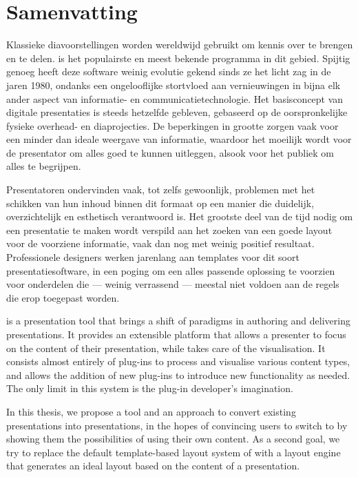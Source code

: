 
 \chapter*{Samenvatting}

  Klassieke diavoorstellingen worden wereldwijd gebruikt om kennis over te
  brengen en te delen. \ppt* is het populairste en meest bekende programma in
  dit gebied. Spijtig genoeg heeft deze software weinig evolutie gekend sinds
  ze het licht zag in de jaren 1980, ondanks een ongelooflijke stortvloed aan
  vernieuwingen in bijna elk ander aspect van informatie- en
  communicatietechnologie. Het basisconcept van digitale presentaties is steeds
  hetzelfde gebleven, gebaseerd op de oorspronkelijke fysieke overhead- en
  diaprojecties. De beperkingen in grootte zorgen vaak voor een minder dan
  ideale weergave van informatie, waardoor het moeilijk wordt voor de
  presentator om alles goed te kunnen uitleggen, alsook voor het publiek om
  alles te begrijpen.

  Presentatoren ondervinden vaak, tot zelfs gewoonlijk, problemen met het
  schikken van hun inhoud binnen dit formaat op een manier die duidelijk,
  overzichtelijk en esthetisch verantwoord is. Het grootste deel van de tijd
  nodig om een presentatie te maken wordt verspild aan het zoeken van een goede
  layout voor de voorziene informatie, vaak dan nog met weinig positief
  resultaat. Professionele designers werken jarenlang aan templates voor dit
  soort presentatiesoftware, in een poging om een alles passende oplossing te
  voorzien voor onderdelen die --- weinig verrassend --- meestal niet voldoen
  aan de regels die erop toegepast worden.

  \mxp is a presentation tool that brings a shift of paradigms in authoring and
  delivering presentations. It provides an extensible platform that allows a
  presenter to focus on the content of their presentation, while \mxp takes
  care of the visualisation. It consists almost entirely of plug-ins to process
  and visualise various content types, and allows the addition of new plug-ins
  to introduce new functionality as needed. The only limit in this system is
  the plug-in developer's imagination.

  In this thesis, we propose a tool and an approach to convert existing \ppt
  presentations into \mxp presentations, in the hopes of convincing \ppt users
  to switch to \mxp by showing them the possibilities of \mxp using their own
  content. As a second goal, we try to replace the default template-based
  layout system of \mxp with a layout engine that generates an ideal layout
  based on the content of a presentation.


